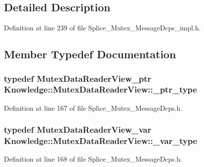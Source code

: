\subsection{Detailed Description}


Definition at line 239 of file Splice\_\-Mutex\_\-MessageDcps\_\-impl.h.



\subsection{Member Typedef Documentation}
\hypertarget{classKnowledge_1_1MutexDataReaderView_a2cd6c0b2ff9b0ecf1e4e559634b68d18}{
\subsubsection[{\_\-ptr\_\-type}]{\setlength{\rightskip}{0pt plus 5cm}typedef {\bf MutexDataReaderView\_\-ptr} {\bf Knowledge::MutexDataReaderView::\_\-ptr\_\-type}}}
\label{db/d72/classKnowledge_1_1MutexDataReaderView_a2cd6c0b2ff9b0ecf1e4e559634b68d18}


Definition at line 167 of file Splice\_\-Mutex\_\-MessageDcps.h.

\hypertarget{classKnowledge_1_1MutexDataReaderView_ab34f732879f05d51fc25bf648bb464b3}{
\subsubsection[{\_\-var\_\-type}]{\setlength{\rightskip}{0pt plus 5cm}typedef {\bf MutexDataReaderView\_\-var} {\bf Knowledge::MutexDataReaderView::\_\-var\_\-type}}}
\label{db/d72/classKnowledge_1_1MutexDataReaderView_ab34f732879f05d51fc25bf648bb464b3}


Definition at line 168 of file Splice\_\-Mutex\_\-MessageDcps.h.



